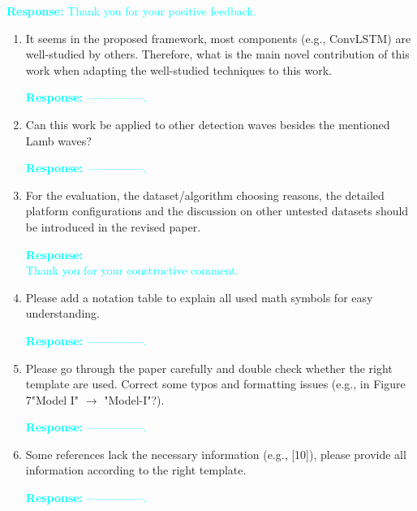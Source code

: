 \documentclass[11pt,a2paper]{report}
\begin{document}
	\textcolor{Cyan}{
	\newline\textbf{Response:}
	Thank you for your positive feedback.
    }
	\begin{enumerate}
		\item It seems in the proposed framework, most components (e.g., 
		ConvLSTM) are well-studied by others. Therefore, what is the main novel 
		contribution of this work when adapting the well-studied techniques to 
		this work.
		
		\textcolor{Cyan}{
			\textbf{Response:}
		---------------.
		}
		
		\item Can this work be applied to other detection waves besides the 
		mentioned Lamb waves?
		
		\textcolor{Cyan}{
			\textbf{Response:}
			---------------.
		}
		\item For the evaluation, the dataset/algorithm choosing reasons, the 
		detailed platform configurations and the discussion on other untested 
		datasets should be introduced in the revised paper.
		
		\textcolor{Cyan}{
			\textbf{Response:\\}
			Thank you for your constructive comment. \\
		}
	
			\item Please add a notation table to explain all used math symbols 
			for easy understanding.
	
	\textcolor{Cyan}{
		\textbf{Response:}
		---------------.
	}	

			\item Please go through the paper carefully and double check 
			whether the right template are used. Correct some typos and 
			formatting issues (e.g., in Figure 7"Model I" $\to$ "Model-I"?).

    \textcolor{Cyan}{
	\textbf{Response:}
	---------------.
}

			\item Some references lack the necessary information (e.g., [10]), 
			please provide all information according to the right template.

\textcolor{Cyan}{
	\textbf{Response:}
	---------------.
}


\end{enumerate}
\end{document}
